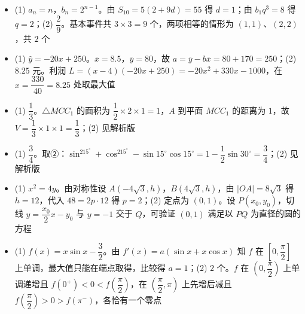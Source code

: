 \begin{itemize}[leftmargin=2.6em]
  \item[\textbf{17.}] (1) $a_n=n$，$b_n=2^{n-1}$。由 $S_{10}=5(2+9d)=55$ 得 $d=1$；由 $b_1q^3=8$ 得 $q=2$；(2) $\dfrac29$。基本事件共 $3\times3=9$ 个，两项相等的情形为 $(1,1)$、$(2,2)$，共 $2$ 个
  \item[\textbf{18.}] (1) $\hat y=-20x+250$。$\bar x=8.5$，$\bar y=80$，故 $a=\bar y-b\bar x=80+170=250$；(2) $8.25$ 元。利润 $L=(x-4)(-20x+250)=-20x^2+330x-1000$，在 $x=\dfrac{330}{40}=8.25$ 处取最大值
  \item[\textbf{19.}] (1) $\dfrac13$。$\triangle MCC_1$ 的面积为 $\dfrac12\times2\times1=1$，$A$ 到平面 $MCC_1$ 的距离为 $1$，故 $V=\dfrac13\times1\times1=\dfrac13$；(2) 见解析版
  \item[\textbf{20.}] (1) $\dfrac34$。取②：$\sin^215^\circ+\cos^215^\circ-\sin15^\circ\cos15^\circ=1-\dfrac12\sin30^\circ=\dfrac34$；(2) 见解析版
  \item[\textbf{21.}] (1) $x^2=4y$。由对称性设 $A(-4\sqrt3,h)$，$B(4\sqrt3,h)$，由 $|OA|=8\sqrt3$ 得 $h=12$，代入 $48=2p\cdot12$ 得 $p=2$；(2) 定点为 $(0,1)$。设 $P(x_0,y_0)$，切线 $y=\dfrac{x_0}2x-y_0$ 与 $y=-1$ 交于 $Q$，可验证 $(0,1)$ 满足以 $PQ$ 为直径的圆的方程
  \item[\textbf{22.}] (1) $f(x)=x\sin x-\dfrac32$。由 $f'(x)=a(\sin x+x\cos x)$ 知 $f$ 在 $\left[0,\dfrac\pi2\right]$ 上单调，最大值只能在端点取得，比较得 $a=1$；(2) $2$ 个。$f$ 在 $\left(0,\dfrac\pi2\right)$ 上单调递增且 $f(0^+)<0<f\left(\dfrac\pi2\right)$，在 $\left(\dfrac\pi2,\pi\right)$ 上先增后减且 $f\left(\dfrac\pi2\right)>0>f(\pi^-)$，各恰有一个零点
\end{itemize}
